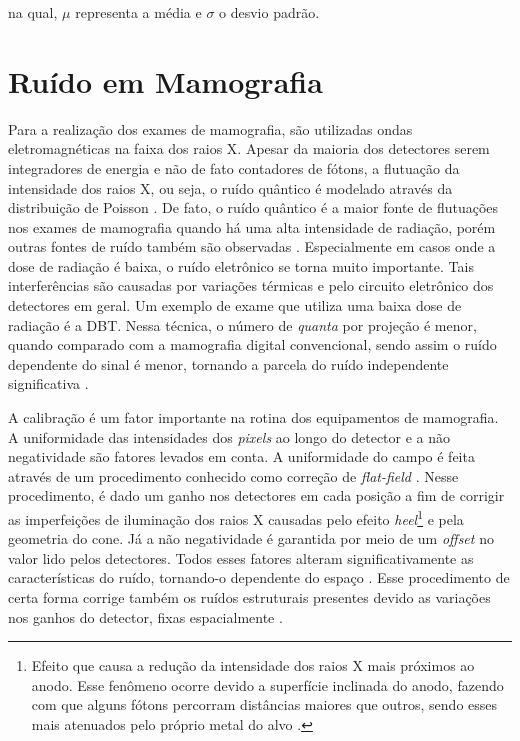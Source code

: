 \noindent na qual, $\mu$ representa a média e $\sigma$ o desvio padrão.

\section{Ruído em Mamografia}\label{Capitulo4:RuidoemMamografia}

Para a realização dos exames de mamografia, são utilizadas ondas eletromagnéticas na faixa dos raios X. Apesar da maioria dos detectores serem integradores de energia e não de fato contadores de fótons, a flutuação da intensidade dos raios X, ou seja, o ruído quântico é modelado através da distribuição de Poisson \cite{yaffe2000handbook,haus2000screen}. De fato, o ruído quântico é a maior fonte de flutuações nos exames de mamografia quando há uma alta intensidade de radiação, porém outras fontes de ruído também são observadas \cite{huda2003experimental,marshall2017handbook}. Especialmente em casos onde a dose de radiação é baixa, o ruído eletrônico se torna muito importante. Tais interferências são causadas por variações térmicas e pelo circuito eletrônico dos detectores em geral. Um exemplo de exame que utiliza uma baixa dose de radiação é a \acs{DBT}. Nessa técnica, o número de \textit{quanta} por projeção é menor, quando comparado com a mamografia digital convencional, sendo assim o ruído dependente do sinal é menor, tornando a parcela do ruído independente significativa \cite{sechopoulos2013review,vedantham2015digital}. 

A calibração é um fator importante na rotina dos equipamentos de mamografia. A uniformidade das intensidades dos \textit{pixels} ao longo do detector e a não negatividade são fatores levados em conta. A uniformidade do campo é feita através de um procedimento conhecido como correção de \textit{flat-field} \cite{marshall2017handbook}. Nesse procedimento, é dado um ganho nos detectores em cada posição a fim de corrigir as imperfeições de iluminação dos raios X causadas pelo efeito \textit{heel}\footnote{Efeito que causa a redução da intensidade dos raios X mais próximos ao anodo. Esse fenômeno ocorre devido a superfície inclinada do anodo, fazendo com que alguns fótons percorram distâncias maiores que outros, sendo esses mais atenuados pelo próprio metal do alvo \cite{boone2000handbook,bushberg2011essential}. } e pela geometria do cone. Já a não negatividade é garantida por meio de um \textit{offset} no valor lido pelos detectores. Todos esses fatores alteram significativamente as características do ruído, tornando-o  dependente do espaço \cite{borges2017pipeline,borges2017method, borges2018restoration,brito2018application,guerrero2018}. Esse procedimento de certa forma corrige também os ruídos estruturais presentes devido as variações nos ganhos do detector, fixas espacialmente \cite{VanEngen2013,marshall2017handbook}.

